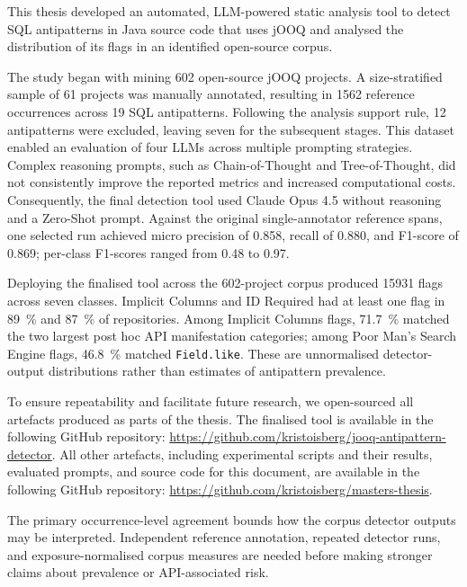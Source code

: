 This thesis developed an automated, LLM-powered static analysis tool to detect SQL antipatterns in Java source code that uses jOOQ and analysed the distribution of its flags in an identified open-source corpus.

The study began with mining \num{602} open-source jOOQ projects. A size-stratified sample of 61 projects was manually annotated, resulting in \num{1562} reference occurrences across 19 SQL antipatterns. Following the analysis support rule, 12 antipatterns were excluded, leaving seven for the subsequent stages. This dataset enabled an evaluation of four LLMs across multiple prompting strategies. Complex reasoning prompts, such as Chain-of-Thought and Tree-of-Thought, did not consistently improve the reported metrics and increased computational costs. Consequently, the final detection tool used Claude Opus 4.5 without reasoning and a Zero-Shot prompt. Against the original single-annotator reference spans, one selected run achieved micro precision of \num{0.858}, recall of \num{0.880}, and F1-score of \num{0.869}; per-class F1-scores ranged from \num{0.48} to \num{0.97}.

Deploying the finalised tool across the \num{602}-project corpus produced \num{15931} flags across seven classes. Implicit Columns and ID Required had at least one flag in \qty{89}{\percent} and \qty{87}{\percent} of repositories. Among Implicit Columns flags, \qty{71.7}{\percent} matched the two largest post hoc API manifestation categories; among Poor Man's Search Engine flags, \qty{46.8}{\percent} matched \texttt{Field.like}. These are unnormalised detector-output distributions rather than estimates of antipattern prevalence.

To ensure repeatability and facilitate future research, we open-sourced all artefacts produced as parts of the thesis. The finalised tool is available in the following GitHub repository: \href{https://github.com/kristoisberg/jooq-antipattern-detector}{https://github.com/kristoisberg/jooq-antipattern-detector}. All other artefacts, including experimental scripts and their results, evaluated prompts, and source code for this document, are available in the following GitHub repository: \href{https://github.com/kristoisberg/masters-thesis}{https://github.com/kristoisberg/masters-thesis}.

The primary occurrence-level agreement bounds how the corpus detector outputs may be interpreted. Independent reference annotation, repeated detector runs, and exposure-normalised corpus measures are needed before making stronger claims about prevalence or API-associated risk.
